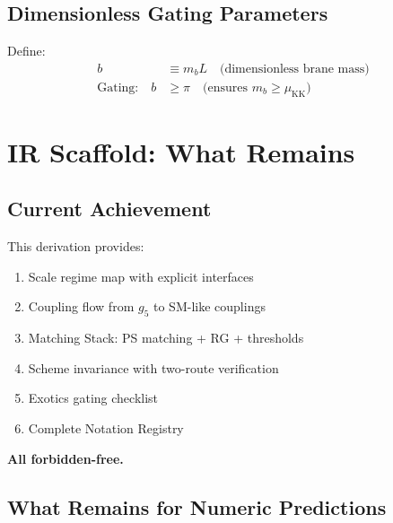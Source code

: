 \documentclass[11pt,a4paper]{article}
\begin{document}
\subsection{Dimensionless Gating Parameters}
\label{subsec:gating-params}

Define:
\begin{align}
\label{eq:b-param}
b &\equiv m_b L \quad \text{(dimensionless brane mass)} \\
\label{eq:gating-condition}
\text{Gating:} \quad b &\geq \pi \quad \text{(ensures } m_b \geq \mu_{\text{KK}} \text{)}
\end{align}

\section{IR Scaffold: What Remains}
\label{sec:ir-scaffold}

\subsection{Current Achievement}
\label{subsec:achievement}

This derivation provides:
\begin{enumerate}
\item Scale regime map with explicit interfaces
\item Coupling flow from $g_5$ to SM-like couplings
\item Matching Stack: PS matching + RG + thresholds
\item Scheme invariance with two-route verification
\item Exotics gating checklist
\item Complete Notation Registry
\end{enumerate}

\textbf{All forbidden-free.}

\subsection{What Remains for Numeric Predictions}
\label{subsec:remaining}
\end{document}
